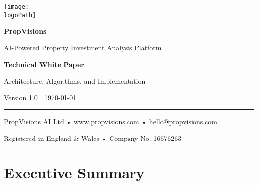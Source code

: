 \documentclass[11pt,a4paper]{article}
\newcommand{\logoPath}{propvisions_logo_croped.png}
\begin{document}
\begin{titlepage}
  \centering
  \vspace*{1.5cm}
  \texttt{[image: \\logoPath]}\par
  \vspace{2cm}
  {\Huge\bfseries\color{brandblue} PropVisions\par}
  \vspace{0.8em}
  {\Large AI-Powered Property Investment Analysis Platform\par}
  \vspace{2.5cm}
  {\LARGE\bfseries Technical White Paper\par}
  \vspace{0.6em}
  {\large Architecture, Algorithms, and Implementation\par}
  \vspace{0.4em}
  {\normalsize Version 1.0 \quad | \quad \today\par}
  \vfill
  \color{brandgray}
  \rule{\textwidth}{0.6pt}\par
  \vspace{0.6em}
  {\small PropVisions AI Ltd \quad • \quad \textcolor{accentblue}{\href{https://www.propvisions.com}{www.propvisions.com}} \quad • \quad hello@propvisions.com\par}
  \vspace{0.4em}
  {\footnotesize Registered in England \& Wales • Company No. 16676263\par}
\end{titlepage}

\clearpage
{}
\pagestyle{fancy}
\fancyhf{}
\setlength{\headheight}{20pt}
\renewcommand{\headrulewidth}{0pt}
\fancyfoot[C]{\thepage}

\tableofcontents
\newpage

\setcounter{page}{1}

\section{Executive Summary}
\end{document}

